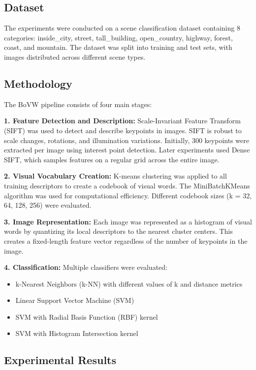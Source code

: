 \documentclass[conference]{IEEEtran}
\begin{document}
\subsection{Dataset}

The experiments were conducted on a scene classification dataset containing 8 categories: inside\_city, street, tall\_building, open\_country, highway, forest, coast, and mountain. The dataset was split into training and test sets, with images distributed across different scene types.

\subsection{Methodology}

The BoVW pipeline consists of four main stages:

\textbf{1. Feature Detection and Description:} Scale-Invariant Feature Transform (SIFT) was used to detect and describe keypoints in images. SIFT is robust to scale changes, rotations, and illumination variations. Initially, 300 keypoints were extracted per image using interest point detection. Later experiments used Dense SIFT, which samples features on a regular grid across the entire image.

\textbf{2. Visual Vocabulary Creation:} K-means clustering was applied to all training descriptors to create a codebook of visual words. The MiniBatchKMeans algorithm was used for computational efficiency. Different codebook sizes (k = 32, 64, 128, 256) were evaluated.

\textbf{3. Image Representation:} Each image was represented as a histogram of visual words by quantizing its local descriptors to the nearest cluster centers. This creates a fixed-length feature vector regardless of the number of keypoints in the image.

\textbf{4. Classification:} Multiple classifiers were evaluated:
\begin{itemize}
\item k-Nearest Neighbors (k-NN) with different values of k and distance metrics
\item Linear Support Vector Machine (SVM)
\item SVM with Radial Basis Function (RBF) kernel
\item SVM with Histogram Intersection kernel
\end{itemize}

\subsection{Experimental Results}
\end{document}
